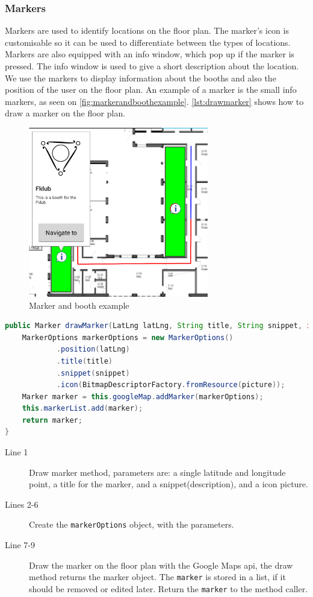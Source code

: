 \subsubsection*{Markers}
Markers are used to identify locations on the floor plan. The marker's icon is customisable so it can be used to differentiate between the types of locations. Markers are also equipped with an info window, which pop up if the marker is pressed. The info window is used to give a short description about the location. We use the markers to display information about the booths and also the position of the user on the floor plan. An example of a marker is the small info markers, as seen on \autoref{fig:markerandboothexample}. \autoref{lst:drawmarker} shows how to draw a marker on the floor plan.
\begin{figure}[H]
\centering
\includegraphics[width=0.7\textwidth]{img/markerandbooth.png}
\caption{Marker and booth example}
\label{fig:markerandboothexample}
\end{figure}
\begin{lstlisting}[language=java, label=lst:drawmarker, caption=Method for drawing a marker.]
public Marker drawMarker(LatLng latLng, String title, String snippet, int picture){
    MarkerOptions markerOptions = new MarkerOptions()
            .position(latLng)
            .title(title)
            .snippet(snippet)
            .icon(BitmapDescriptorFactory.fromResource(picture));
    Marker marker = this.googleMap.addMarker(markerOptions);
    this.markerList.add(marker);
    return marker;
}
\end{lstlisting}
\begin{description}
\item[Line 1] Draw marker method, parameters are: a single latitude and longitude point, a title for the marker, and a snippet(description), and a icon picture. 
\item[Lines 2-6] Create the \lstinline|markerOptions| object, with the parameters.
\item[Line 7-9] Draw the marker on the floor plan with the Google Maps \ac{api}, the draw method returns the marker object. The \lstinline|marker| is stored in a list, if it should be removed or edited later. Return the \lstinline|marker| to the method caller.
\end{description}


